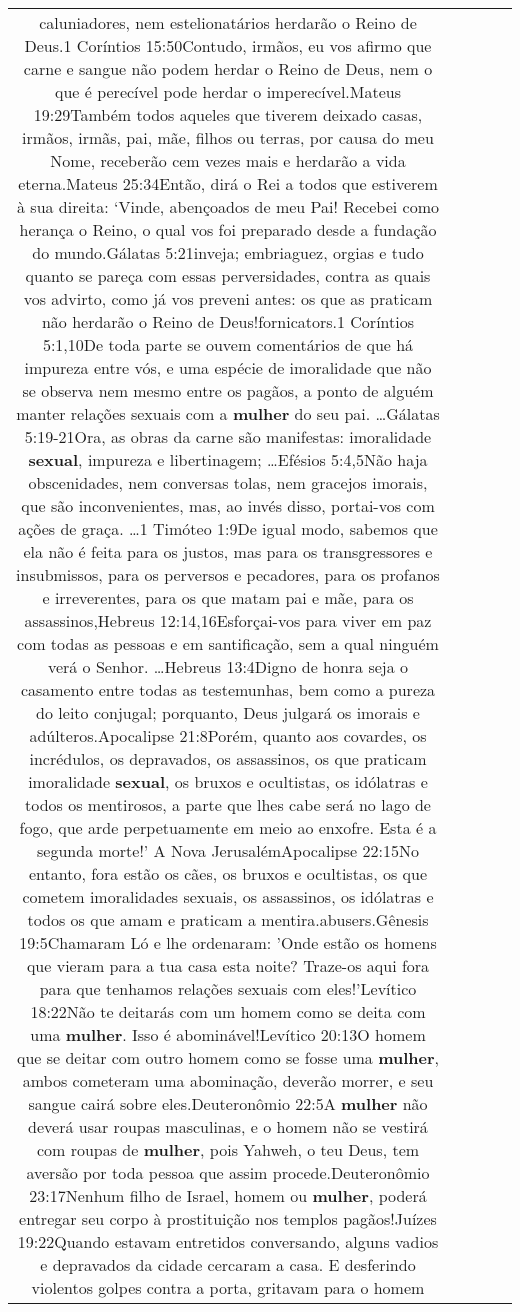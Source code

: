 \documentclass[11pt]{article}
\newlength\mylength
\begin{document}
\begin{center}
\begin{longtable}{|C{.65\mylength}|C{.30\mylength}|C{.12\mylength}|C{.12\mylength}|C{.12\mylength}|}
caluniadores, nem estelionatários herdarão o Reino de Deus.1 Coríntios 15:50Contudo, irmãos, eu vos afirmo que carne e sangue não podem herdar o Reino de Deus, nem o que é perecível pode herdar o imperecível.Mateus 19:29Também todos aqueles que tiverem deixado casas, irmãos, irmãs, pai, mãe, filhos ou terras, por causa do meu Nome, receberão cem vezes mais e herdarão a vida eterna.Mateus 25:34Então, dirá o Rei a todos que estiverem à sua direita: ‘Vinde, abençoados de meu Pai! Recebei como herança o Reino, o qual vos foi preparado desde a fundação do mundo.Gálatas 5:21inveja; embriaguez, orgias e tudo quanto se pareça com essas perversidades, contra as quais vos advirto, como já vos preveni antes: os que as praticam não herdarão o Reino de Deus!fornicators.1 Coríntios 5:1,10De toda parte se ouvem comentários de que há impureza entre vós, e uma espécie de imoralidade que não se observa nem mesmo entre os pagãos, a ponto de alguém manter relações sexuais com a \textbf{mulher} do seu pai. …Gálatas 5:19-21Ora, as obras da carne são manifestas: imoralidade \textbf{sexual}, impureza e libertinagem; …Efésios 5:4,5Não haja obscenidades, nem conversas tolas, nem gracejos imorais, que são inconvenientes, mas, ao invés disso, portai-vos com ações de graça. …1 Timóteo 1:9De igual modo, sabemos que ela não é feita para os justos, mas para os transgressores e insubmissos, para os perversos e pecadores, para os profanos e irreverentes, para os que matam pai e mãe, para os assassinos,Hebreus 12:14,16Esforçai-vos para viver em paz com todas as pessoas e em santificação, sem a qual ninguém verá o Senhor. …Hebreus 13:4Digno de honra seja o casamento entre todas as testemunhas, bem como a pureza do leito conjugal; porquanto, Deus julgará os imorais e adúlteros.Apocalipse 21:8Porém, quanto aos covardes, os incrédulos, os depravados, os assassinos, os que praticam imoralidade \textbf{sexual}, os bruxos e ocultistas, os idólatras e todos os mentirosos, a parte que lhes cabe será no lago de fogo, que arde perpetuamente em meio ao enxofre. Esta é a segunda morte!' A Nova JerusalémApocalipse 22:15No entanto, fora estão os cães, os bruxos e ocultistas, os que cometem imoralidades sexuais, os assassinos, os idólatras e todos os que amam e praticam a mentira.abusers.Gênesis 19:5Chamaram Ló e lhe ordenaram: 'Onde estão os homens que vieram para a tua casa esta noite? Traze-os aqui fora para que tenhamos relações sexuais com eles!'Levítico 18:22Não te deitarás com um homem como se deita com uma \textbf{mulher}. Isso é abominável!Levítico 20:13O homem que se deitar com outro homem como se fosse uma \textbf{mulher}, ambos cometeram uma abominação, deverão morrer, e seu sangue cairá sobre eles.Deuteronômio 22:5A \textbf{mulher} não deverá usar roupas masculinas, e o homem não se vestirá com roupas de \textbf{mulher}, pois Yahweh, o teu Deus, tem aversão por toda pessoa que assim procede.Deuteronômio 23:17Nenhum filho de Israel, homem ou \textbf{mulher}, poderá entregar seu corpo à prostituição nos templos pagãos!Juízes 19:22Quando estavam entretidos conversando, alguns vadios e depravados da cidade cercaram a casa. E desferindo violentos golpes contra a porta, gritavam para o homem 
\end{longtable}
\end{center}
\end{document}
